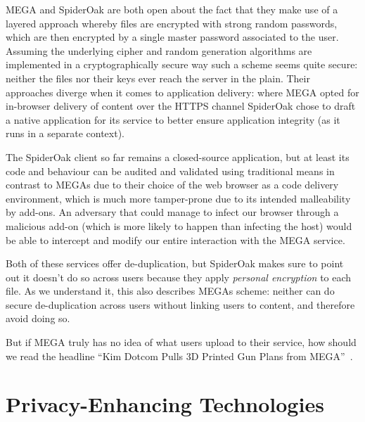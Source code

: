 \documentclass[11pt]{article}
\begin{document}
MEGA and SpiderOak are both open about the fact that they make use of a layered approach whereby files are encrypted with strong random passwords, which are then encrypted by a single master password associated to the user.
Assuming the underlying cipher and random generation algorithms are implemented in a cryptographically secure way such a scheme seems quite secure: neither the files nor their keys ever reach the server in the plain.
Their approaches diverge when it comes to application delivery: where MEGA opted for in-browser delivery of content over the HTTPS channel SpiderOak chose to draft a native application for its service to better ensure application integrity (as it runs in a separate context).

The SpiderOak client so far remains a closed-source application, but at least its code and behaviour can be audited and validated using traditional means in contrast to MEGAs due to their choice of the web browser as a code delivery environment, which is much more tamper-prone due to its intended malleability by add-ons.
An adversary that could manage to infect our browser through a malicious add-on (which is more likely to happen than infecting the host) would be able to intercept and modify our entire interaction with the MEGA service.

Both of these services offer de-duplication, but SpiderOak makes sure to point out it doesn't do so across users because they apply \textit{personal encryption} to each file.
As we understand it, this also describes MEGAs scheme: neither can do secure de-duplication across users without linking users to content, and therefore avoid doing so.

But if MEGA truly has no idea of what users upload to their service, how should we read the headline ``Kim Dotcom Pulls 3D Printed Gun Plans from MEGA''~\cite{3d_gun}.


\section{Privacy-Enhancing Technologies}
\label{sec:pet}
\end{document}
